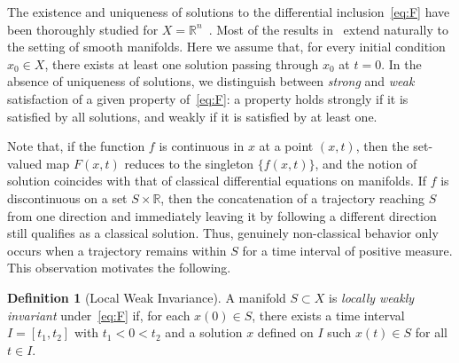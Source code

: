 \documentclass{article}
\theoremstyle{definition}
\newtheorem{definition}{Definition}
\theoremstyle{remark}
\newcommand{\CNE}{\mathcal{U}}	%
\newcommand{\MA}{X}	%
\newcommand{\NE}{U}	%
\newcommand{\RR}{\mathbb{R}}	%
\newcommand{\SW}{S}	%
\DeclareMathOperator{\co}{co}
\begin{document}


The existence and uniqueness of solutions to the differential inclusion~\eqref{eq:F} have been thoroughly studied 
for $\MA = \RR^n$~\cite{filippov}. Most of the results in~\cite{filippov} extend naturally to the setting of smooth manifolds.
Here we assume that, for every initial condition $x_0 \in \MA$, there exists at least one solution
passing through $x_0$ at $t=0$. In the absence of uniqueness of solutions, we distinguish between \emph{strong} and \emph{weak}
satisfaction of a given property of~\eqref{eq:F}: a property holds strongly if it is satisfied by all solutions, and weakly if it 
is satisfied by at least one.

Note that, if the function $f$ is continuous in $x$ at a point $(x,t)$, then the set-valued map $F(x,t)$ reduces to the singleton $\{f(x,t)\}$,
and the notion of solution coincides with that of classical differential equations on manifolds. If $f$ is discontinuous on a
set $\SW\times\RR$, then the concatenation of a trajectory reaching $\SW$ from one direction and immediately leaving it by following 
a different direction still qualifies as a classical solution. Thus, genuinely non-classical behavior only occurs when a
trajectory remains within $\SW$ for a time interval of positive measure. This observation motivates the following.

\begin{definition}[Local Weak Invariance] A manifold $\SW \subset \MA$ is \emph{locally weakly invariant} under~\eqref{eq:F} if, for each
 $x(0) \in \SW$, there exists a time interval $I = [t_1, t_2]$ with $t_1 < 0 < t_2$ and a solution $x$ defined on $I$ such $x(t) \in \SW$
 for all $t \in I$.
\end{definition}
\end{document}
